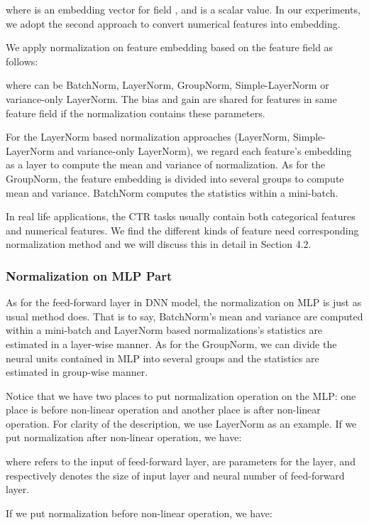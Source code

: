 \documentclass[sigconf]{acmart}
\begin{document}
where  is an embedding vector for field , and  is a scalar value. In our experiments, we adopt the second approach to convert numerical features into embedding.




 We apply normalization on feature embedding based on the feature field as follows:



where  can be BatchNorm, LayerNorm, GroupNorm, Simple-LayerNorm or variance-only LayerNorm. The bias and gain are shared for features in same feature field if the normalization contains these parameters.


For the LayerNorm based normalization approaches (LayerNorm, Simple-LayerNorm and variance-only LayerNorm), we regard each feature's embedding as a layer to compute the mean and variance of normalization. As for the GroupNorm, the feature embedding is divided into several groups to compute mean and variance. BatchNorm computes the statistics within a mini-batch.


In real life applications, the CTR tasks usually contain both categorical features and numerical features. We find the different kinds of feature need corresponding normalization method and we will discuss this in detail in Section 4.2.



 \subsubsection{\textbf{Normalization on MLP Part}}
As for the feed-forward layer in DNN model, the normalization on MLP is just as usual method does. That is to say, BatchNorm's  mean and variance are computed within a mini-batch and  LayerNorm based normalizations's statistics are estimated in a layer-wise manner. As for the GroupNorm, we can divide the neural units contained in MLP into several groups and the statistics are estimated in group-wise manner.


Notice that we have two places to put normalization operation on the MLP: one place is before non-linear operation and another place is after non-linear operation. For clarity of the description, we use LayerNorm as an example.  If we put normalization after non-linear operation, we have:

where  refers to the input of feed-forward layer,  are parameters for the layer,  and  respectively denotes the  size of input layer and neural number of feed-forward layer.


If we put normalization before non-linear operation, we have:
\end{document}
